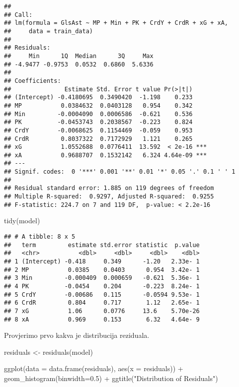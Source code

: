 \documentclass[
]{article}
\newenvironment{Shaded}{\begin{snugshade}}{\end{snugshade}}
\newcommand{\AttributeTok}[1]{\textcolor[rgb]{0.77,0.63,0.00}{#1}}
\newcommand{\FloatTok}[1]{\textcolor[rgb]{0.00,0.00,0.81}{#1}}
\newcommand{\FunctionTok}[1]{\textcolor[rgb]{0.00,0.00,0.00}{#1}}
\newcommand{\NormalTok}[1]{#1}
\newcommand{\OtherTok}[1]{\textcolor[rgb]{0.56,0.35,0.01}{#1}}
\newcommand{\SpecialCharTok}[1]{\textcolor[rgb]{0.00,0.00,0.00}{#1}}
\newcommand{\StringTok}[1]{\textcolor[rgb]{0.31,0.60,0.02}{#1}}
\begin{document}
\begin{verbatim}
## 
## Call:
## lm(formula = GlsAst ~ MP + Min + PK + CrdY + CrdR + xG + xA, 
##     data = train_data)
## 
## Residuals:
##     Min      1Q  Median      3Q     Max 
## -4.9477 -0.9753  0.0532  0.6860  5.6336 
## 
## Coefficients:
##               Estimate Std. Error t value Pr(>|t|)    
## (Intercept) -0.4180695  0.3490420  -1.198    0.233    
## MP           0.0384632  0.0403128   0.954    0.342    
## Min         -0.0004090  0.0006586  -0.621    0.536    
## PK          -0.0453743  0.2038567  -0.223    0.824    
## CrdY        -0.0068625  0.1154469  -0.059    0.953    
## CrdR         0.8037322  0.7172929   1.121    0.265    
## xG           1.0552688  0.0776411  13.592  < 2e-16 ***
## xA           0.9688707  0.1532142   6.324 4.64e-09 ***
## ---
## Signif. codes:  0 '***' 0.001 '**' 0.01 '*' 0.05 '.' 0.1 ' ' 1
## 
## Residual standard error: 1.885 on 119 degrees of freedom
## Multiple R-squared:  0.9297, Adjusted R-squared:  0.9255 
## F-statistic: 224.7 on 7 and 119 DF,  p-value: < 2.2e-16
\end{verbatim}

\begin{Shaded}
\begin{Highlighting}[]
\FunctionTok{tidy}\NormalTok{(model)}
\end{Highlighting}
\end{Shaded}

\begin{verbatim}
## # A tibble: 8 x 5
##   term         estimate std.error statistic  p.value
##   <chr>           <dbl>     <dbl>     <dbl>    <dbl>
## 1 (Intercept) -0.418     0.349      -1.20   2.33e- 1
## 2 MP           0.0385    0.0403      0.954  3.42e- 1
## 3 Min         -0.000409  0.000659   -0.621  5.36e- 1
## 4 PK          -0.0454    0.204      -0.223  8.24e- 1
## 5 CrdY        -0.00686   0.115      -0.0594 9.53e- 1
## 6 CrdR         0.804     0.717       1.12   2.65e- 1
## 7 xG           1.06      0.0776     13.6    5.70e-26
## 8 xA           0.969     0.153       6.32   4.64e- 9
\end{verbatim}

Provjerimo prvo kakva je distribucija reziduala.

\begin{Shaded}
\begin{Highlighting}[]
\NormalTok{residuals }\OtherTok{\textless{}{-}} \FunctionTok{residuals}\NormalTok{(model)}

\FunctionTok{ggplot}\NormalTok{(}\AttributeTok{data =} \FunctionTok{data.frame}\NormalTok{(residuals), }\FunctionTok{aes}\NormalTok{(}\AttributeTok{x =}\NormalTok{ residuals)) }\SpecialCharTok{+} \FunctionTok{geom\_histogram}\NormalTok{(}\AttributeTok{binwidth=}\FloatTok{0.5}\NormalTok{) }\SpecialCharTok{+} \FunctionTok{ggtitle}\NormalTok{(}\StringTok{"Distribution of Residuals"}\NormalTok{)}
\end{Highlighting}
\end{Shaded}
\end{document}
